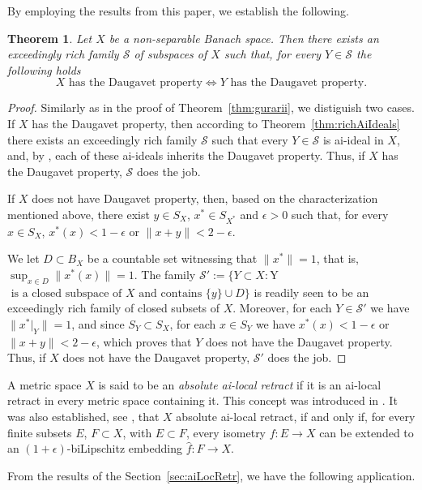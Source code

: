 \documentclass[11pt]{amsart}
\newtheorem{thm}{Theorem}
\theoremstyle{definition}
\theoremstyle{remark}
\newcommand{\SSS}{\mathcal S}
\begin{document}
By employing the results from this paper, we establish the following.

\begin{thm}\label{thm:daugavet}
Let $X$ be a non-separable Banach space. Then there exists an exceedingly rich family $\SSS$ of subspaces of $X$ such that, for every $Y\in \SSS$ the following holds
\[
X \text{ has the Daugavet property} \Leftrightarrow Y\text{ has the Daugavet property}.
\]
\end{thm}
\begin{proof}Similarly as in the proof of Theorem~\ref{thm:gurarii}, we distiguish two cases.
If $X$ has the Daugavet property, then according to Theorem~\ref{thm:richAiIdeals} there exists 
an exceedingly rich family $\SSS$ such that every $Y\in\SSS$ is ai-ideal in $X$, and, by \cite[Proposition 3.8]{Abr14}, each of these ai-ideals inherits the Daugavet property. Thus, if $X$ has the Daugavet property, $\SSS$ does the job.

If $X$ does not have Daugavet property, then, based on the characterization mentioned above, there exist $y\in S_X$, $x^*\in S_{X^*}$ and $\epsilon>0$ such that, for every $x\in S_X$, $x^*(x)<1-\epsilon$ or $\|x + y\|<2 - \epsilon$.

We let $D\subset B_X$ be a countable set witnessing that $\|x^*\|=1$, that is, $\sup_{x\in D}\|x^*(x)\|=1$. The family $\SSS':=\{Y\subset X\colon $Y$\text{ is a closed subspace of }X\text{ and contains } \{y\}\cup D\}$ is readily seen to be an exceedingly rich family of closed subsets of $X$. Moreover, for each $Y\in \SSS'$ we have $\|x^*|_Y\|=1$, and since 
$S_Y\subset S_X$, for each $x\in S_Y$ we have $x^*(x)<1-\epsilon$ or $\|x + y\|<2 - \epsilon$, which proves that $Y$
does not have the Daugavet property. Thus, if $X$ does not have the Daugavet property, $\SSS'$ does the job.
\end{proof}



A metric space $X$ is said to be an \emph{absolute ai-local retract} if it is an ai-local retract in every metric space containing it. This concept was introduced in \cite[Definition 4.1]{QuilisZoca}. It was also established, see \cite[Theorem 4.5]{QuilisZoca}, that $X$ absolute ai-local retract, if and only if, for every finite subsets $E$, $F\subset X$, with $E\subset F$, every isometry $f:E\to X$ can be extended to an $(1+\epsilon)$-biLipschitz embedding $\widehat{f}:F\to X$.

From the results of the Section~\ref{sec:aiLocRetr}, we have the following application.
\end{document}
